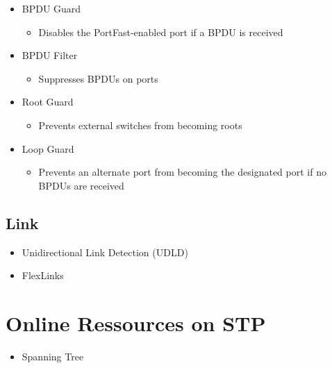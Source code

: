 \begin{itemize}
 \item BPDU Guard
    \begin{itemize}
        \item Disables the PortFast-enabled port if a BPDU is received
    \end{itemize}
 \item BPDU Filter
    \begin{itemize}
        \item Suppresses BPDUs on ports
    \end{itemize}
 \item Root Guard
    \begin{itemize}
        \item Prevents external switches from becoming roots
    \end{itemize}
 \item Loop Guard
    \begin{itemize}
        \item Prevents an alternate port from becoming the designated port if no BPDUs are received
    \end{itemize}
\end{itemize}

\subsection{Link}

\begin{itemize}
	\item Unidirectional Link Detection (UDLD)
	\item FlexLinks
\end{itemize}

\section*{Online Ressources on STP}

\begin{itemize}
    \item Spanning Tree \@WikiPedia \cite{wp_spanningtree}
\end{itemize}